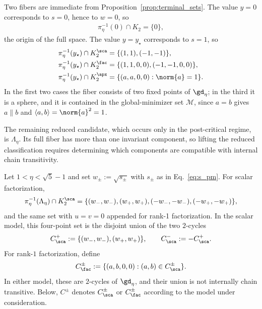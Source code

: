 \documentclass{article}
\begin{document}
Two fibers are immediate from Proposition~\ref{prop:terminal_sets}. The value
$y=0$ corresponds to $s=0$, hence to $w=0$, so
\begin{align}
    \pi_\eta^{-1}(0)\cap K_2=\{0\},
    \label{eq:fiber_origin}
\end{align}
the origin of the full space. The value $y=y_\star$ corresponds to $s=1$, so
\begin{align}
    \pi_\eta^{-1}(y_\star)\cap K_2^\sca &= \{(1,1),(-1,-1)\},
    \notag\\
    \pi_\eta^{-1}(y_\star)\cap K_2^\fac &= \{(1,1,0,0),(-1,-1,0,0)\},
    \label{eq:fiber_minimizer}\\
    \pi_\eta^{-1}(y_\star)\cap K_2^\apx &= \{(a,a,0,0):\norm{a}=1\}.
    \notag
\end{align}
In the first two cases the fiber consists of two fixed points of $\gd_\eta$; in
the third it is a sphere, and it is contained in the global-minimizer set
$\mathcal M$, since $a=b$ gives $a\parallel b$ and
$\langle a,b\rangle=\norm{a}^2=1$.

The remaining reduced candidate, which occurs only in the post-critical regime,
is $\Lambda_\eta$. Its full fiber has more than one invariant component, so
lifting the reduced classification requires determining which components are
compatible with internal chain transitivity.

\begin{lemma}
\label{lem:signed_cycle_split}
Let $1<\eta<\sqrt5-1$ and set $w_\pm:=\sqrt{s_\pm}$ with $s_\pm$ as in
Eq.~\eqref{eq:s_pm}. For scalar factorization,
\begin{align}
    \pi_\eta^{-1}(\Lambda_\eta)\cap K_2^\sca
    =
    \{(w_-,w_-),(w_+,w_+),(-w_-,-w_-),(-w_+,-w_+)\},
    \label{eq:four_point_fiber}
\end{align}
and the same set with $u=v=0$ appended for rank-1 factorization. In the scalar
model, this four-point set is the disjoint union of the two $2$-cycles
\begin{align}
    C_\sca^+:=\{(w_-,w_-),(w_+,w_+)\},
    \qquad
    C_\sca^-:=-C_\sca^+.
\end{align}
For rank-$1$ factorization, define
\begin{align}
    C_\fac^\pm
    :=
    \{(a,b,0,0):(a,b)\in C_\sca^\pm\}.
\end{align}
In either model, these are $2$-cycles of $\gd_\eta$, and their union is not
internally chain transitive. Below, $C^\pm$ denotes $C_\sca^\pm$ or
$C_\fac^\pm$ according to the model under consideration.
\end{lemma}
\end{document}
